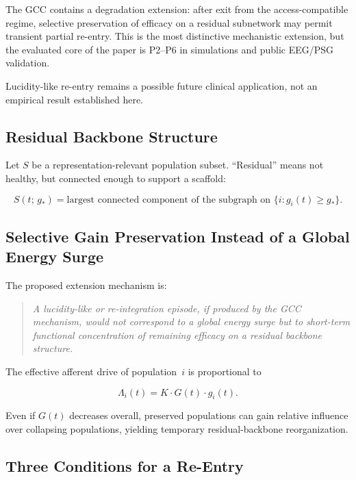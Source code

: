 \documentclass[11pt,a4paper]{article}
\theoremstyle{plain}
\theoremstyle{definition}
\theoremstyle{remark}
\begin{document}
The GCC contains a degradation extension: after exit from the access-compatible regime, selective preservation of efficacy on a residual subnetwork may permit transient partial re-entry. This is the most distinctive mechanistic extension, but the evaluated core of the paper is P2--P6 in simulations and public EEG/PSG validation.

Lucidity-like re-entry remains a possible future clinical application, not an empirical result established here.

\subsection{Residual Backbone Structure}

Let $S$ be a representation-relevant population subset. ``Residual'' means not healthy, but connected enough to support a scaffold:

\begin{equation}
\label{eq:backbone}
S(t;\,g_*) = \text{largest connected component of the subgraph on } \{i : g_i(t) \geq g_*\}.
\end{equation}

\subsection{Selective Gain Preservation Instead of a Global Energy Surge}

The proposed extension mechanism is:

\begin{quote}
\itshape
A lucidity-like or re-integration episode, if produced by the GCC mechanism, would not correspond to a global energy surge but to short-term functional concentration of remaining efficacy on a residual backbone structure.
\end{quote}

The effective afferent drive of population~$i$ is proportional to

\begin{equation}
\label{eq:Lambda}
\Lambda_i(t) = K \cdot G(t) \cdot g_i(t).
\end{equation}

Even if $G(t)$ decreases overall, preserved populations can gain relative influence over collapsing populations, yielding temporary residual-backbone reorganization.

\subsection{Three Conditions for a Re-Entry}
\end{document}
